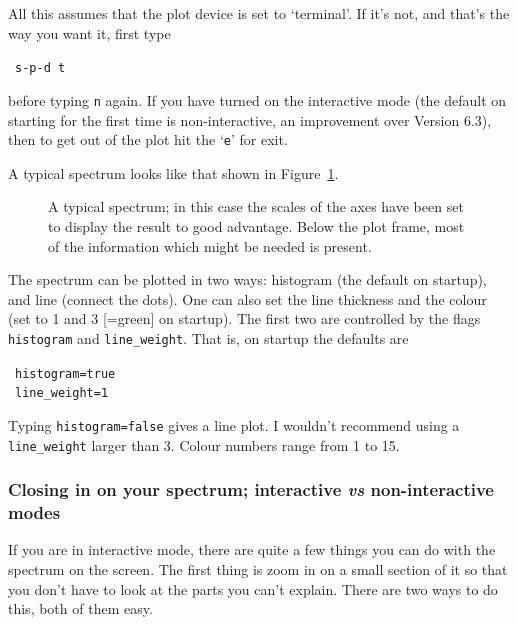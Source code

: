 All this assumes that the plot device is set to `terminal'. If it's not,
and that's the way you want it, first type

\SP\ {\tt s-p-d t}

before typing {\tt n} again. If you have turned on the interactive
mode (the default on starting  for the first time is
non-interactive, an improvement over Version 6.3), then to get out of
the plot hit the `{\tt{e}}' for exit.

A typical spectrum looks like that shown in
Figure~\ref{fig:specx_plot}.
%
\begin{figure}[htb]
\centering
\leavevmode
\epsfysize=4in
\vspace*{-0.5cm}
\begin{center}
\begin{minipage}[t]{5in}
\caption[A typical plot]
{\small{A typical spectrum; in this case the scales of the axes have
been set to display the result to good advantage. Below the plot
frame, most of the information which might be needed is present.}  }
\label{fig:specx_plot}
\end{minipage}
\end{center}
\end{figure}

The spectrum can be plotted in two ways: histogram (the default on
startup), and line (connect the dots). One can also set the line
thickness and the colour (set to 1 and 3 [=green] on startup). 
The first two are controlled by the flags
{\tt histogram} and {\tt line\_weight}. That is, on startup the
defaults are

\SP\ {\tt histogram=true}\\
\SP\ {\tt line\_weight=1}

Typing {\tt histogram=false} gives a line plot. I wouldn't recommend
using a {\tt line\_weight} larger than 3. Colour numbers range from 1 to 15.


\subsubsection{Closing in on your spectrum; interactive {\it vs}
non-interactive modes}
\label{sec:specx_5.1}
If you are in interactive mode, there are quite a few things
you can do with the spectrum on the screen. The first thing is zoom in
on a small section of it so that you don't have to look at the parts
you can't explain.  There are two ways to do this, both of them easy.

